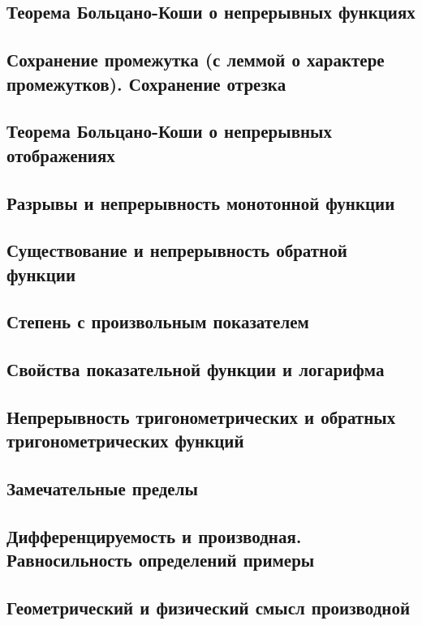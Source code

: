 \subsection{Теорема Больцано-Коши о непрерывных функциях}

\skip
\subsection{Сохранение промежутка (с леммой о характере промежутков). Сохранение отрезка}

\skip
\subsection{Теорема Больцано-Коши о непрерывных отображениях}

\skip
\subsection{Разрывы и непрерывность монотонной функции}

\skip
\subsection{Существование и непрерывность обратной функции}

\skip
\subsection{Степень с произвольным показателем}

\skip
\subsection{Свойства показательной функции и логарифма}

\skip
\subsection{Непрерывность тригонометрических и обратных тригонометрических функций}

\skip
\subsection{Замечательные пределы}

\skip
\subsection{Дифференцируемость и производная. Равносильность определений примеры}

\skip
\subsection{Геометрический и физический смысл производной}

\skip
